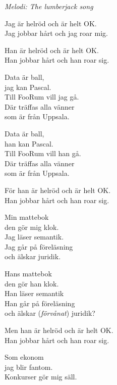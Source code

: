 {\footnotesize\textit{Melodi: The lumberjack song}}\par
\vspace{10pt}
Jag är helröd och är helt OK.\\
Jag jobbar hårt och jag roar mig.\par
\vspace{10pt}
Han är helröd och är helt OK.\\
Han jobbar hårt och han roar sig.\par
\vspace{10pt}
Data är ball,\\
jag kan Pascal.\\
Till FooRum vill jag gå.\\
Där träffas alla vänner\\
som är från Uppsala.\par
\vspace{10pt}
Data är ball,\\
han kan Pascal.\\
Till FooRum vill han gå.\\
Där träffas alla vänner\\
som är från Uppsala.\par
\vspace{10pt}
För han är helröd och är helt OK.\\
Han jobbar hårt och han roar sig.\par
\vspace{10pt}
Min mattebok\\
den gör mig klok.\\
Jag läser semantik.\\
Jag går på föreläsning\\
och älskar juridik.\par
\newpage
Hans mattebok\\
den gör han klok.\\
Han läser semantik\\
Han går på föreläsning\\
och älskar (\textit{förvånat}) juridik?\par
\vspace{10pt}
Men han är helröd och är helt OK.\\
Han jobbar hårt och han roar sig.\par
\vspace{10pt}
Som ekonom\\
jag blir fantom.\\
Konkurser gör mig säll.\\
